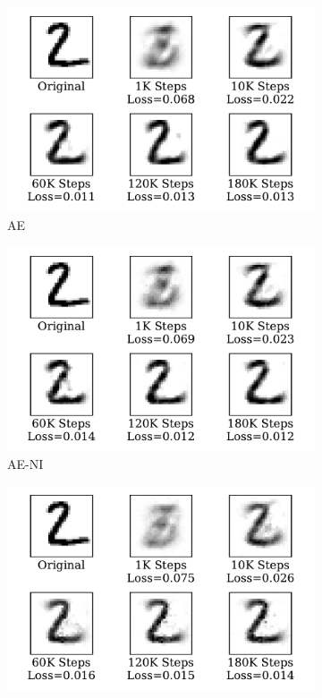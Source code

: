 \begin{figure}
	\centering
	\begin{subfigure}[t]{0.32\textwidth}
		\includegraphics[width=\textwidth]{pics_sdlm/22_MNIST_AE/recon_digit.pdf}
		\caption{AE}
	\end{subfigure}
	\begin{subfigure}[t]{0.32\textwidth}
		\includegraphics[width=\textwidth]{pics_sdlm/23_MNIST_AE_noise/recon_digit.pdf}
		\caption{AE-NI}
	\end{subfigure}
	\begin{subfigure}[t]{0.32\textwidth}
		\includegraphics[width=\textwidth]{pics_sdlm/40_MNIST_SAE_original/recon_digit.pdf}

\end{subfigure}
\end{figure}
